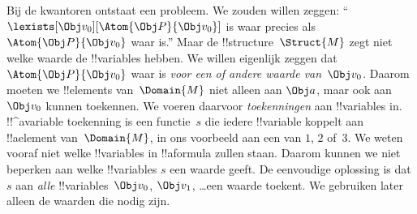 \documentclass[openany]{memoir}
\begin{document}
Bij de kwantoren ontstaat een probleem. We zouden willen zeggen:
``$\lexists[\Obj v_0][\Atom{\Obj P}{\Obj v_0}]$ is waar precies als
$\Atom{\Obj P}{\Obj v_0}$ waar is.'' Maar de
!!{structure}~$\Struct{M}$ zegt niet welke waarde de !!{variable}s
hebben. We willen eigenlijk zeggen dat $\Atom{\Obj P}{\Obj v_0}$ waar
is \emph{voor een of andere waarde van~$\Obj v_0$}. Daarom moeten we
!!{element}s van~$\Domain{M}$ niet alleen aan $\Obj a$, maar ook
aan~$\Obj v_0$ kunnen toekennen. We voeren daarvoor \emph{toekenningen}
aan !!{variable}s in. !!^a{variable} toekenning is een functie~$s$ die
iedere !!{variable} koppelt aan !!a{element} van~$\Domain{M}$, in ons
voorbeeld aan een van $1$, $2$ of~$3$. We weten vooraf niet welke
!!{variable}s in !!a{formula} zullen staan. Daarom kunnen we niet
beperken aan welke !!{variable}s $s$ een waarde geeft. De eenvoudige
oplossing is dat $s$ aan \emph{alle} !!{variable}s~$\Obj v_0$,
$\Obj v_1$, \dots\@ een waarde toekent. We gebruiken later alleen de
waarden die nodig zijn.
\end{document}
